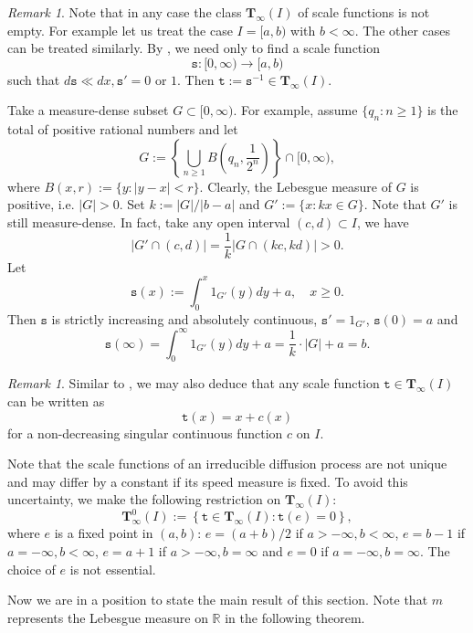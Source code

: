 \documentclass[a4paper]{amsart}
\theoremstyle{definition}
\theoremstyle{remark}
\newtheorem{remark}[theorem]{Remark}
\numberwithin{equation}{section}
\begin{document}
\begin{remark}
Note that in any case the class ${{\mathbf{T}}}_\infty(I)$ of scale functions is not empty.
 For example let us treat the case $I=[a,b)$ with $b<\infty$. The other cases can be treated similarly. By \cite[Theorem~4.1]{FFY05}, we need only to find a scale function
\[
	{{\mathtt{s}}}: [0, \infty) \rightarrow [a,b)
\]
such that $d{{\mathtt{s}}}\ll dx, {{\mathtt{s}}}'=0$ or $1$. Then ${{\mathtt{t}}}:={{\mathtt{s}}}^{-1}\in {{\mathbf{T}}}_{\infty}(I)$.

Take a measure-dense subset $G\subset [0,\infty)$. For example, assume $\{q_n: n\geq 1\}$ is the total of positive rational numbers and let
\[
	G:=\left\{\bigcup_{n\geq 1} B\left(q_n, \frac{1}{2^n}\right)\right\} \cap [0,\infty),
\]
where $B(x,r):=\{y: |y-x|<r\}$. Clearly, the Lebesgue measure of $G$ is positive, i.e. $|G|>0$. Set $k:=|G|/|b-a|$ and $G':=\{x: kx\in G\}$. Note that $G'$ is still measure-dense. In fact, take any open interval $(c,d)\subset I$, we have
\[
|G'\cap (c,d)|= \frac{1}{k}|G\cap (kc, kd)|>0.
\]
Let
\[
	{{\mathtt{s}}}(x):=\int_0^x 1_{G'}(y)dy+a,\quad x\geq 0.
\]
Then ${{\mathtt{s}}}$ is strictly increasing and absolutely continuous, ${{\mathtt{s}}}'=1_{G'}$, ${{\mathtt{s}}}(0)=a$ and
\[
	{{\mathtt{s}}}(\infty)=\int_0^\infty 1_{G'}(y)dy+a=\frac{1}{k}\cdot |G|+a=b.
\]
\end{remark}

\begin{remark}
Similar to \cite[Theorem~4.1]{FFY05}, we may also deduce that any scale function ${{\mathtt{t}}}\in {{\mathbf{T}}}_\infty(I)$ can be written as
\[
{{\mathtt{t}}}(x)=x+c(x)
\]
for a non-decreasing singular continuous function $c$ on $I$.
\end{remark}

Note that the scale functions of an irreducible diffusion process are not unique and may differ by a constant if its speed measure is fixed.
To avoid this uncertainty, we make the following restriction on ${{\mathbf{T}}}_\infty(I)$:
\begin{equation}\label{EQ2TIT}
{{\mathbf{T}}}^0_\infty(I):=\left\{{{\mathtt{t}}}\in {{\mathbf{T}}}_\infty(I): {{\mathtt{t}}}\left(e\right)=0\right\},
\end{equation}
where $e$ is a fixed point in $(a,b)$: $e=(a+b)/2$ if $a>-\infty, b<\infty$, $e=b-1$ if $a=-\infty, b<\infty$, $e=a+1$ if $a>-\infty, b=\infty$ and $e=0$ if $a=-\infty, b=\infty$. The choice of $e$ is not essential.

Now we are in a position to state the main result of this section.
Note that $m$ represents the Lebesgue measure on $\mathbb{R}$ in  the following theorem.
\end{document}
